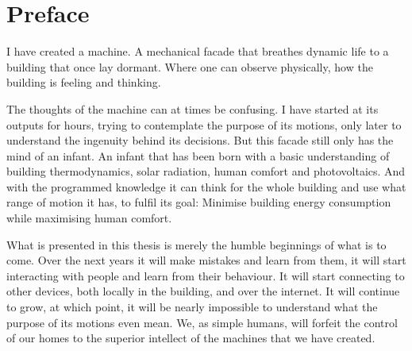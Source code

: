 \begingroup
\let\clearpage\relax
\let\cleardoublepage\relax
\let\cleardoublepage\relax

\chapter*{Preface}

I have created a machine. A mechanical facade that breathes dynamic life to a building that once lay dormant. Where one can observe physically, how the building is feeling and thinking. 

The thoughts of the machine can at times be confusing. I have started at its outputs for hours, trying to contemplate the purpose of its motions, only later to understand the ingenuity behind its decisions. But this facade still only has the mind of an infant. An infant that has been born with a basic understanding of building thermodynamics, solar radiation, human comfort and photovoltaics. And with the programmed knowledge it can think for the whole building and use what range of motion it has, to fulfil its goal: Minimise building energy consumption while maximising human comfort.

What is presented in this thesis is merely the humble beginnings of what is to come. Over the next years it will make mistakes and learn from them, it will start interacting with people and learn from their behaviour. It will start connecting to other devices, both locally in the building, and over the internet. It will continue to grow, at which point, it will be nearly impossible to understand what the purpose of its motions even mean. We, as simple humans, will forfeit the control of our homes to the superior intellect of the machines that we have created.

\endgroup

\cleardoublepage%
